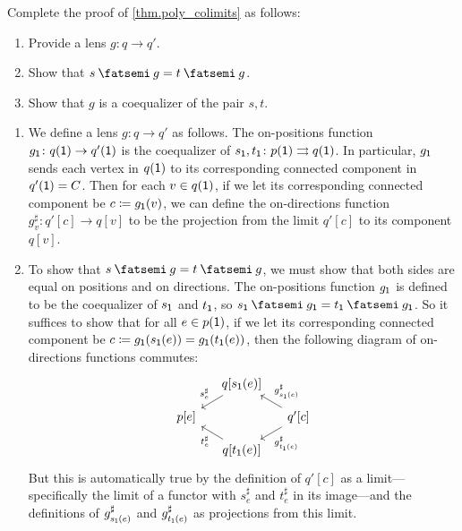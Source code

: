 \documentclass[Book-Poly]{subfiles}
\begin{document}
\begin{exercise}\label{exc.poly_colimits}
Complete the proof of \cref{thm.poly_colimits} as follows:
\begin{enumerate}
	\item Provide a lens $g \colon q \to q'$.
	\item Show that $s \then g = t \then g$.
	\item Show that $g$ is a coequalizer of the pair $s, t$.
\qedhere
\end{enumerate}
\begin{solution}
\begin{enumerate}
    \item We define a lens $g \colon q \to q'$ as follows.
    The on-positions function $g_{\textsf{1}} \colon q(\textsf{1}) \to q'(\textsf{1})$ is the coequalizer of $s_{\textsf{1}}, t_{\textsf{1}} \colon p(\textsf{1}) \rightrightarrows q(\textsf{1})$.
    In particular, $g_{\textsf{1}}$ sends each vertex in $q(\textsf{1})$ to its corresponding connected component in $q'(\textsf{1}) = C$.
    Then for each $v \in q(\textsf{1})$, if we let its corresponding connected component be $c \coloneqq g_{\textsf{1}}(v)$, we can define the on-directions function $g^\sharp_v \colon q'[c] \to q[v]$ to be the projection from the limit $q'[c]$ to its component $q[v]$.

    \item To show that $s \then g = t \then g$, we must show that both sides are equal on positions and on directions.
    The on-positions function $g_{\textsf{1}}$ is defined to be the coequalizer of $s_{\textsf{1}}$ and $t_{\textsf{1}}$, so $s_\1 \then g_\1 = t_\1 \then g_\1$.
    So it suffices to show that for all $e \in p(\textsf{1})$, if we let its corresponding connected component be $c \coloneqq g_{\textsf{1}}(s_{\textsf{1}}(e)) = g_{\textsf{1}}(t_{\textsf{1}}(e))$, then the following diagram of on-directions functions commutes:
    \[
    \begin{tikzcd}[sep=small]
        & q[s_\1(e)] \ar[dl, "s^\sharp_e"'] \\
        p[e] & & q'[c] \ar[ul, "g^\sharp_{s_\1(e)}"'] \ar[dl, "g^\sharp_{t_\1(e)}"] \\
        & q[t_\1(e)] \ar[ul, "t^\sharp_e"]
    \end{tikzcd}
    \]
    But this is automatically true by the definition of $q'[c]$ as a limit---specifically the limit of a functor with $s^\sharp_e$ and $t^\sharp_e$ in its image---and the definitions of $g^\sharp_{s_{\textsf{1}}(e)}$ and $g^\sharp_{t_{\textsf{1}}(e)}$ as projections from this limit.


\end{enumerate}
\end{solution}
\end{exercise}
\end{document}
